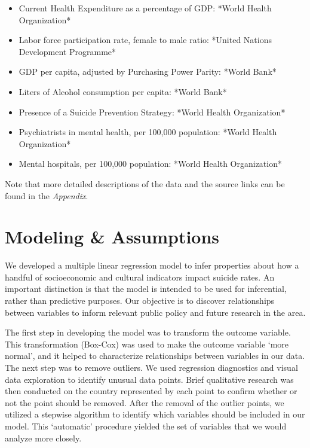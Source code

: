 \documentclass[]{article}
\begin{document}
\begin{itemize}
  \item Current Health Expenditure as a percentage of GDP: *World Health Organization*  
  \item Labor force participation rate, female to male ratio: *United Nations Development Programme*
  \item GDP per capita, adjusted by Purchasing Power Parity: *World Bank*
  \item Liters of Alcohol consumption per capita: *World Bank*
  \item Presence of a Suicide Prevention Strategy: *World Health Organization*
  \item Psychiatrists in mental health, per 100,000 population: *World Health Organization*
  \item Mental hospitals, per 100,000 population: *World Health Organization*
\end{itemize}

Note that more detailed descriptions of the data and the source links
can be found in the \emph{Appendix}.

\section{Modeling \& Assumptions}\label{modeling-assumptions}

We developed a multiple linear regression model to infer properties
about how a handful of socioeconomic and cultural indicators impact
suicide rates. An important distinction is that the model is intended to
be used for inferential, rather than predictive purposes. Our objective
is to discover relationships between variables to inform relevant public
policy and future research in the area.

The first step in developing the model was to transform the outcome
variable. This transformation (Box-Cox) was used to make the outcome
variable `more normal', and it helped to characterize relationships
between variables in our data. The next step was to remove outliers. We
used regression diagnostics and visual data exploration to identify
unusual data points. Brief qualitative research was then conducted on
the country represented by each point to confirm whether or not the
point should be removed. After the removal of the outlier points, we
utilized a stepwise algorithm to identify which variables should be
included in our model. This `automatic' procedure yielded the set of
variables that we would analyze more closely.
\end{document}

